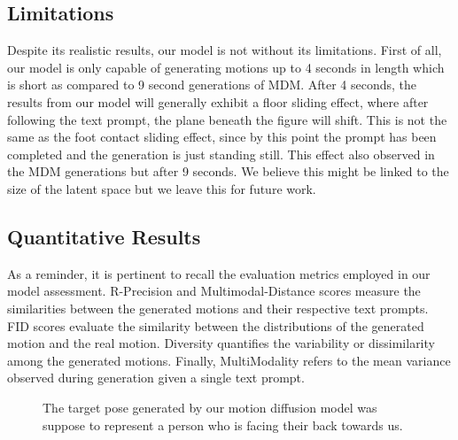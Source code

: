 \documentclass[10pt,twocolumn,letterpaper]{article}
\begin{document}
\subsection{Limitations}
Despite its realistic results, our model is not without its limitations. First of all, our model is only capable of generating motions
up to 4 seconds in length which is short as compared to 9 second generations of MDM. After 4 seconds, the results from our model will generally exhibit a floor sliding effect, where after following the text prompt, the plane beneath the
figure will shift. This is not the same as the foot contact sliding effect, since by this point the prompt has been completed and the generation is just 
standing still. This effect also observed in the MDM generations but after 9 seconds. We believe this might be linked to the size of the latent space but
we leave this for future work.


\subsection{Quantitative Results}

As a reminder, it is pertinent to recall the evaluation metrics employed in our model assessment. R-Precision and Multimodal-Distance scores measure the similarities 
between the generated motions and their respective text prompts. FID scores evaluate the similarity between the distributions of the generated motion and the real 
motion. Diversity quantifies the variability or dissimilarity among the generated motions. Finally, MultiModality refers to the mean variance observed during 
generation given a single text prompt.
\\

\begin{figure}[h!]
    \centering

    \caption{The target pose generated by our motion diffusion model was suppose to represent a 
    person who is facing their back towards us.}
    \label{fig:pidm-2}
\end{figure}
\end{document}
